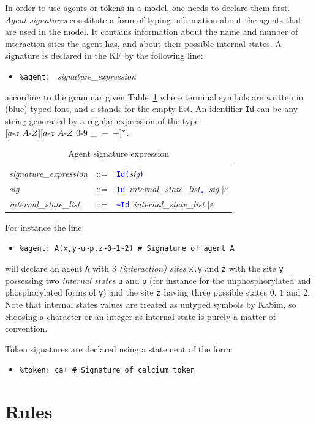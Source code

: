 \documentclass[11pt]{book}
\def\KaSim{\textsf{KaSim}}
\def\sep{\hbox{-}}
\def\intstate{\textasciitilde}
\def\tcb#1{\textcolor{blue}{\ttt{#1}}}
\def\ttt#1{\texttt{#1}}
\def\ITE#1{\begin{itemize}#1\end{itemize}}
\begin{document}
In order to use agents or tokens in a model, one needs to declare them first. \emph{Agent signatures} constitute a form of typing information about the agents that are used in the model. It contains information about the name and number of interaction sites the agent has, and about their possible internal states. A signature is declared in the KF by the following line:
\ITE{
\item[] \ttt{\%agent: } \textit{signature\_expression}
}
according to the grammar given Table~\ref{tab:sig} where terminal symbols are written in (blue) typed font, and $\varepsilon$ stands for the empty list. An identifier
 \ttt{Id} can be any string generated by a regular expression of the type $[a\sep z\ A\sep Z][a\sep z\ A \sep Z\ 0\sep 9\ \_ \ -\ +]^*$. 
\begin{table}[htbp]
  \centering
  \caption{Agent signature expression}
  \begin{tabular}{@{} lcl @{}}
    \textit{signature\_expression} & ::= & \tcb{Id}\tcb{(}\textit{sig}\tcb{)} \\ 
    \textit{sig} & ::= & \tcb{Id}~\textit{internal\_state\_list}\tcb{,}\ \textit{sig} $\mid\varepsilon$ \\ 
    \textit{internal\_state\_list} & ::= & \tcb{\intstate Id}~\textit{internal\_state\_list} $\mid\varepsilon$ 
    \end{tabular}
  \label{tab:sig}
\end{table}

For instance the line:
\ITE{
\item[] \ttt{\%agent: A(x,y\intstate u\intstate p,z\intstate 0\intstate 1\intstate 2) \# Signature of agent A}
}
will declare an agent \ttt{A} with 3 \emph{(interaction) sites} \ttt{x,y} and \ttt{z} with the site \ttt{y} possessing two \emph{internal states} \ttt{u} and \ttt{p} (for instance for the unphosphorylated and phosphorylated forms of \ttt{y}) and the site \ttt{z} having three possible states $0$, $1$ and $2$. Note that internal states values are treated as untyped symbols by \KaSim, so choosing a character or an integer as internal state is purely a matter of convention. 

Token signatures are declared using a statement of the form:
\ITE{
\item[] \ttt{\%token: ca+ \# Signature of calcium token} 
}

\section{Rules}\label{sec:rules}
\end{document}
